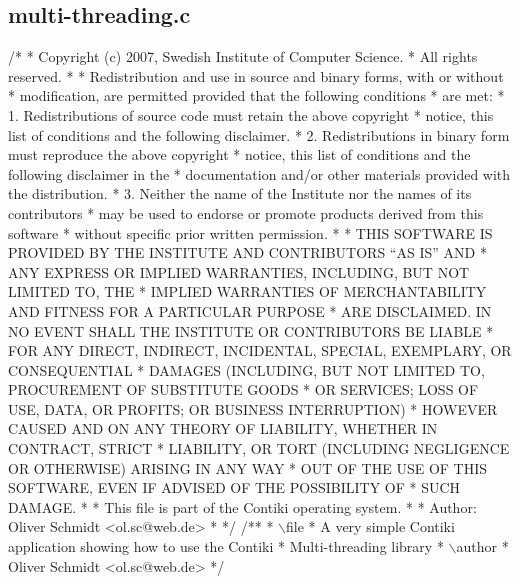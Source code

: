 \hypertarget{a00012}{}\subsection{multi-\/threading.\+c}

\begin{DoxyCodeInclude}
\textcolor{comment}{/*}
\textcolor{comment}{ * Copyright (c) 2007, Swedish Institute of Computer Science.}
\textcolor{comment}{ * All rights reserved. }
\textcolor{comment}{ *}
\textcolor{comment}{ * Redistribution and use in source and binary forms, with or without }
\textcolor{comment}{ * modification, are permitted provided that the following conditions }
\textcolor{comment}{ * are met: }
\textcolor{comment}{ * 1. Redistributions of source code must retain the above copyright }
\textcolor{comment}{ *    notice, this list of conditions and the following disclaimer. }
\textcolor{comment}{ * 2. Redistributions in binary form must reproduce the above copyright }
\textcolor{comment}{ *    notice, this list of conditions and the following disclaimer in the }
\textcolor{comment}{ *    documentation and/or other materials provided with the distribution. }
\textcolor{comment}{ * 3. Neither the name of the Institute nor the names of its contributors }
\textcolor{comment}{ *    may be used to endorse or promote products derived from this software }
\textcolor{comment}{ *    without specific prior written permission. }
\textcolor{comment}{ *}
\textcolor{comment}{ * THIS SOFTWARE IS PROVIDED BY THE INSTITUTE AND CONTRIBUTORS ``AS IS'' AND }
\textcolor{comment}{ * ANY EXPRESS OR IMPLIED WARRANTIES, INCLUDING, BUT NOT LIMITED TO, THE }
\textcolor{comment}{ * IMPLIED WARRANTIES OF MERCHANTABILITY AND FITNESS FOR A PARTICULAR PURPOSE }
\textcolor{comment}{ * ARE DISCLAIMED.  IN NO EVENT SHALL THE INSTITUTE OR CONTRIBUTORS BE LIABLE }
\textcolor{comment}{ * FOR ANY DIRECT, INDIRECT, INCIDENTAL, SPECIAL, EXEMPLARY, OR CONSEQUENTIAL }
\textcolor{comment}{ * DAMAGES (INCLUDING, BUT NOT LIMITED TO, PROCUREMENT OF SUBSTITUTE GOODS }
\textcolor{comment}{ * OR SERVICES; LOSS OF USE, DATA, OR PROFITS; OR BUSINESS INTERRUPTION) }
\textcolor{comment}{ * HOWEVER CAUSED AND ON ANY THEORY OF LIABILITY, WHETHER IN CONTRACT, STRICT }
\textcolor{comment}{ * LIABILITY, OR TORT (INCLUDING NEGLIGENCE OR OTHERWISE) ARISING IN ANY WAY }
\textcolor{comment}{ * OUT OF THE USE OF THIS SOFTWARE, EVEN IF ADVISED OF THE POSSIBILITY OF }
\textcolor{comment}{ * SUCH DAMAGE. }
\textcolor{comment}{ *}
\textcolor{comment}{ * This file is part of the Contiki operating system.}
\textcolor{comment}{ * }
\textcolor{comment}{ * Author: Oliver Schmidt <ol.sc@web.de>}
\textcolor{comment}{ *}
\textcolor{comment}{ */}
\textcolor{comment}{}
\textcolor{comment}{/**}
\textcolor{comment}{ * \(\backslash\)file}
\textcolor{comment}{ *         A very simple Contiki application showing how to use the Contiki}
\textcolor{comment}{ *         Multi-threading library}
\textcolor{comment}{ * \(\backslash\)author}
\textcolor{comment}{ *         Oliver Schmidt <ol.sc@web.de>}
\textcolor{comment}{ */}


\end{DoxyCodeInclude}
